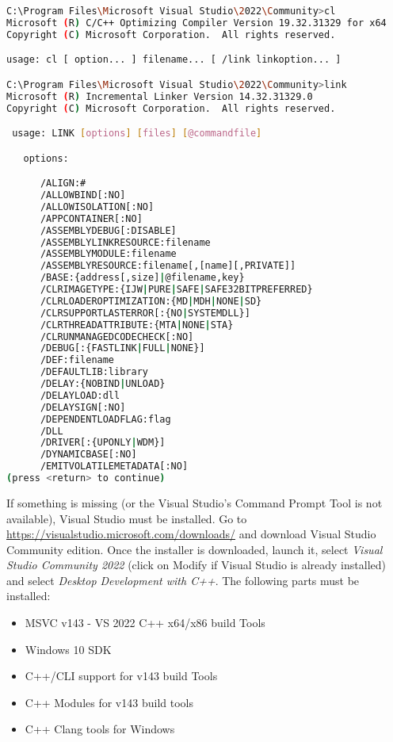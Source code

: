 \begin{lstlisting}[language=bash,caption={bash version}]
C:\Program Files\Microsoft Visual Studio\2022\Community>cl
Microsoft (R) C/C++ Optimizing Compiler Version 19.32.31329 for x64
Copyright (C) Microsoft Corporation.  All rights reserved.

usage: cl [ option... ] filename... [ /link linkoption... ]

C:\Program Files\Microsoft Visual Studio\2022\Community>link
Microsoft (R) Incremental Linker Version 14.32.31329.0
Copyright (C) Microsoft Corporation.  All rights reserved.

 usage: LINK [options] [files] [@commandfile]

   options:

      /ALIGN:#
      /ALLOWBIND[:NO]
      /ALLOWISOLATION[:NO]
      /APPCONTAINER[:NO]
      /ASSEMBLYDEBUG[:DISABLE]
      /ASSEMBLYLINKRESOURCE:filename
      /ASSEMBLYMODULE:filename
      /ASSEMBLYRESOURCE:filename[,[name][,PRIVATE]]
      /BASE:{address[,size]|@filename,key}
      /CLRIMAGETYPE:{IJW|PURE|SAFE|SAFE32BITPREFERRED}
      /CLRLOADEROPTIMIZATION:{MD|MDH|NONE|SD}
      /CLRSUPPORTLASTERROR[:{NO|SYSTEMDLL}]
      /CLRTHREADATTRIBUTE:{MTA|NONE|STA}
      /CLRUNMANAGEDCODECHECK[:NO]
      /DEBUG[:{FASTLINK|FULL|NONE}]
      /DEF:filename
      /DEFAULTLIB:library
      /DELAY:{NOBIND|UNLOAD}
      /DELAYLOAD:dll
      /DELAYSIGN[:NO]
      /DEPENDENTLOADFLAG:flag
      /DLL
      /DRIVER[:{UPONLY|WDM}]
      /DYNAMICBASE[:NO]
      /EMITVOLATILEMETADATA[:NO]
(press <return> to continue)

\end{lstlisting}

If something is missing (or the Visual Studio's Command Prompt Tool is not available), Visual Studio must be installed. Go to \href{https://visualstudio.microsoft.com/downloads/}{https://visualstudio.microsoft.com/downloads/} and download Visual Studio Community edition. Once the installer is downloaded, launch it, select \textit{Visual Studio Community 2022} (click on Modify if Visual Studio is already installed) and select \textit{Desktop Development with C++}. The following parts must be installed:

\begin{itemize}
    \item MSVC v143 - VS 2022 C++ x64/x86 build Tools
    \item Windows 10 SDK 
    \item C++/CLI support for v143 build Tools
    \item C++ Modules for v143 build tools
    \item C++ Clang tools for Windows 
\end{itemize}

